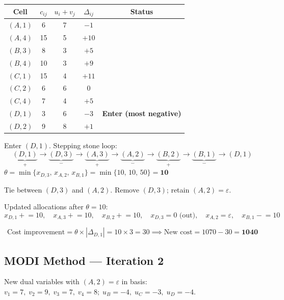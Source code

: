 \documentclass[12pt]{article}
\begin{document}
\begin{center}
\renewcommand{\arraystretch}{1.3}
\begin{tabular}{|c|c|c|c|c|}
  \hline
  \rowcolor{primary}
  {\color{white}\textbf{Cell}} &
  {\color{white}$c_{ij}$} &
  {\color{white}$u_i+v_j$} &
  {\color{white}$\Delta_{ij}$} &
  {\color{white}\textbf{Status}} \\
  \hline
  $(A,1)$ & 6 & 7 & $-1$ & \\
  \hline
  $(A,4)$ & 15 & 5 & $+10$ & \\
  \hline
  $(B,3)$ & 8 & 3 & $+5$ & \\
  \hline
  $(B,4)$ & 10 & 3 & $+9$ & \\
  \hline
  $(C,1)$ & 15 & 4 & $+11$ & \\
  \hline
  $(C,2)$ & 6 & 6 & $0$ & \\
  \hline
  $(C,4)$ & 7 & 4 & $+5$ & \\
  \hline
  \rowcolor{red!15} $(D,1)$ & 3 & 6 & $-3$ & \textbf{Enter (most negative)} \\
  \hline
  $(D,2)$ & 9 & 8 & $+1$ & \\
  \hline
\end{tabular}
\end{center}

\vspace{4pt}
Enter $(D,1)$. Stepping stone loop:
\[
  \underbrace{(D,1)}_{+} \to
  \underbrace{(D,3)}_{-} \to
  \underbrace{(A,3)}_{+} \to
  \underbrace{(A,2)}_{-} \to
  \underbrace{(B,2)}_{+} \to
  \underbrace{(B,1)}_{-} \to (D,1)
\]
$\theta = \min\{x_{D,3},\, x_{A,2},\, x_{B,1}\} = \min\{10,\,10,\,50\} = \mathbf{10}$

Tie between $(D,3)$ and $(A,2)$. Remove $(D,3)$; retain $(A,2)=\varepsilon$.

\medskip
Updated allocations after $\theta = 10$:
\[
  x_{D,1} \mathrel{+}= 10,\quad x_{A,3} \mathrel{+}= 10,\quad x_{B,2} \mathrel{+}= 10,\quad
  x_{D,3} = 0\text{ (out)},\quad x_{A,2} = \varepsilon,\quad x_{B,1} \mathrel{-}= 10
\]

\[
  \text{Cost improvement} = \theta \times |\Delta_{D,1}| = 10 \times 3 = 30
  \implies \text{New cost} = 1070 - 30 = \mathbf{1040}
\]

\subsection*{MODI Method --- Iteration 2}

New dual variables with $(A,2)=\varepsilon$ in basis:
$v_1=7,\; v_2=9,\; v_3=7,\; v_4=8;\; u_B=-4,\; u_C=-3,\; u_D=-4$.
\end{document}
